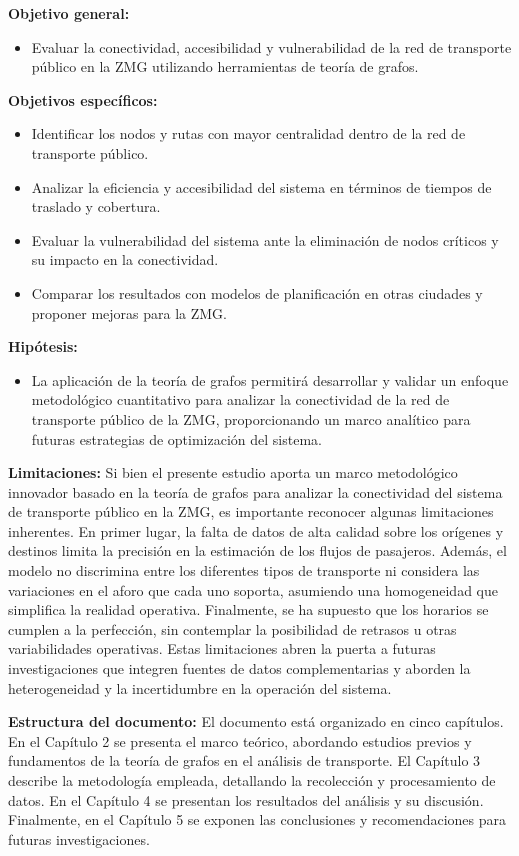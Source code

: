 \documentclass[openany]{book}
\begin{document}
\textbf{Objetivo general:}
\begin{itemize}
	\item Evaluar la conectividad, accesibilidad y vulnerabilidad de la red de transporte público en la ZMG utilizando herramientas de teoría de grafos.
\end{itemize}

\textbf{Objetivos específicos:}
\begin{itemize}
	\item Identificar los nodos y rutas con mayor centralidad dentro de la red de transporte público.
	\item Analizar la eficiencia y accesibilidad del sistema en términos de tiempos de traslado y cobertura.
	\item Evaluar la vulnerabilidad del sistema ante la eliminación de nodos críticos y su impacto en la conectividad.
	\item Comparar los resultados con modelos de planificación en otras ciudades y proponer mejoras para la ZMG.
\end{itemize}

\textbf{Hipótesis:}
\begin{itemize}
	\item La aplicación de la teoría de grafos permitirá desarrollar y validar un enfoque metodológico cuantitativo para analizar la conectividad de la red de transporte público de la ZMG, proporcionando un marco analítico para futuras estrategias de optimización del sistema.
\end{itemize}

\textbf{Limitaciones:} Si bien el presente estudio aporta un marco metodológico innovador basado en la teoría de grafos para analizar la conectividad del sistema de transporte público en la ZMG, es importante reconocer algunas limitaciones inherentes. En primer lugar, la falta de datos de alta calidad sobre los orígenes y destinos limita la precisión en la estimación de los flujos de pasajeros. Además, el modelo no discrimina entre los diferentes tipos de transporte ni considera las variaciones en el aforo que cada uno soporta, asumiendo una homogeneidad que simplifica la realidad operativa. Finalmente, se ha supuesto que los horarios se cumplen a la perfección, sin contemplar la posibilidad de retrasos u otras variabilidades operativas. Estas limitaciones abren la puerta a futuras investigaciones que integren fuentes de datos complementarias y aborden la heterogeneidad y la incertidumbre en la operación del sistema.

\textbf{Estructura del documento:}
El documento está organizado en cinco capítulos. En el Capítulo 2 se presenta el marco teórico, abordando estudios previos y fundamentos de la teoría de grafos en el análisis de transporte. El Capítulo 3 describe la metodología empleada, detallando la recolección y procesamiento de datos. En el Capítulo 4 se presentan los resultados del análisis y su discusión. Finalmente, en el Capítulo 5 se exponen las conclusiones y recomendaciones para futuras investigaciones.
\end{document}

